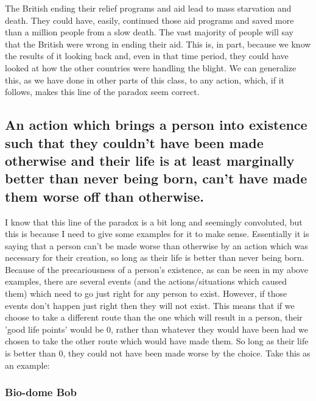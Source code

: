 The British ending their relief programs and aid lead to mass starvation and death. They could have, easily, continued those aid programs and saved more than a million people from a slow death. The vast majority of people will say that the British were wrong in ending their aid. This is, in part, because we know the results of it looking back and, even in that time period, they could have looked at how the other countries were handling the blight. We can generalize this, as we have done in other parts of this class, to any action, which, if it follows, makes this line of the paradox seem correct. 
\subsection{An action which brings a person into existence such that they couldn’t have been made otherwise and their life is at least marginally better than never being born, can’t have made them worse off than otherwise.}

I know that this line of the paradox is a bit long and seemingly convoluted, but this is because I need to give some examples for it to make sense. Essentially it is saying that a person can't be made worse than otherwise by an action which was necessary for their creation, so long as their life is better than never being born. Because of the precariousness of a person's existence, as can be seen in my above examples, there are several events (and the actions/situations which caused them) which need to go just right for any person to exist. However, if those events don't happen just right then they will not exist. This means that if we choose to take a different route than the one which will result in a person, their 'good life points' would be 0, rather than whatever they would have been had we chosen to take the other route which would have made them. So long as their life is better than 0, they could not have been made worse by the choice. Take this as an example:
\subsubsection{Bio-dome Bob}


